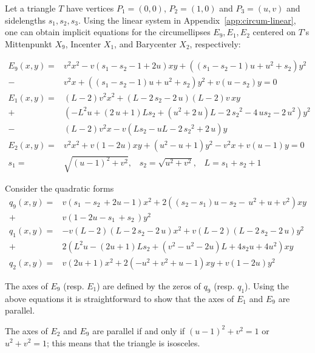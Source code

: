 Let a triangle $T$ have vertices $P_1=(0,0)$, $P_2=(1,0)$ and $P_3=(u,v)$ and sidelengths $s_1,s_2,s_3$. Using the linear system in Appendix~\ref{app:circum-linear}, one can obtain implicit equations for the circumellipses $E_9,E_1,E_2$ centered on $T$'s Mittenpunkt $X_9$, Incenter $X_1$, and Barycenter $X_2$, respectively:

\begin{align*}
E_9(x,y)=&  v^2 x^2-v(s_1 -s_2-1+2u)xy+((s_1-s_2-1)u+u^2+s_2 )y^2\\
-&v^2x+((s_1-s_2-1)u+u^2+s_2)y^2+v(u-s_2)y=0\\
%
E_1(x,y)=&  \left( L-2 \right) {v}^{2}{x}^{2} + \left( L-2\,{ s_2}-2\,u
 \right)   \left( L-2 \right) v\, xy \\
 +& \left( 
-{L}^{2}u+ \left( 2\,u+1 \right) L{ s_2}+ \left( {u}^{2}+2\,u
 \right) L-2\,{s_2}^{2}-4\,u{ s_2}-2\,{u}^{2} \right) {y}^{2}\\
 -& \left( L-2 \right) {v}^{2} x
 - v\left( L{ s_2}-uL-2\,{s_2}^{2}+2\,u \right) y 
\\
E_2(x,y)=&v^2x^2+v(1-2u)xy+(u^2-u+1)y^2-v^2x+v(u-1)y=0\\
s_1=& \sqrt{(u-1)^2+v^2},\;\;\; s_2=\sqrt{u^2+v^2}, \;\;\; L=s_1+s_2+1
\end{align*}

Consider the quadratic forms
\begin{align*}
    q_9(x,y)=&   v\left(  { s_1}\, -{ s_2}\, +2 u  -1 \right) {x}^{2}+ 2\left(  (s_2-s_1)u
 - { s_2} - \,{u}^{2}+ u+  {v}^{2}
 \right) xy\\
 +& v\left( 1-2u - { s_1}\, +{ s_2}\,    \right) {y}^{2}
 \\
 q_1(x,y)=& -v \left( L-2 \right)  \left( L-2\,{ s_2}-2\,u \right) {x}^{2}+v  \left( L-2 \right)  \left( L-2\,{ s_2}-2\,u\right)y^2 \\
 +&
2 (  L^2u-(2u+1)Ls_2+(v^2-u^2-2u)L+ 4s_2u+4u^2 ) xy\\
q_2(x,y)=&v(2u+1)x^2+2(-u^2+v^2+u-1)xy+v(1-2u)y^2
\end{align*}

The axes of $E_9$ (resp. $E_1$) are defined by the zeros of $q_9$ (resp. $q_1$). Using the above equations it is straightforward to show that the axes of $E_1$ and $E_9$ are parallel.

The axes of $E_2$ and $E_9$ are parallel if and only if $(u-1)^2+v^2=1$ or $u^2+v^2=1$; this means that the triangle is isosceles.

